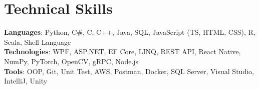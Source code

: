 \section{\color{ResumeColor}\textbf{Technical Skills}}
    \begin{itemize}[leftmargin=0.15in, label={}]
	\small{\item{
		\textbf{Languages}{: Python, C\#, C, C++, Java, SQL, JavaScript (TS, HTML, CSS), R, Scala, Shell Language}\\
		\textbf{Technologies}{: WPF, ASP.NET, EF Core, LINQ, REST API, React Native, NumPy, PyTorch, OpenCV, gRPC, Node.js} \\
		\textbf{Tools}{: OOP, Git, Unit Test, AWS, Postman, Docker, SQL Server, Visual Studio, IntelliJ, Unity} \\
	}}
    \end{itemize}